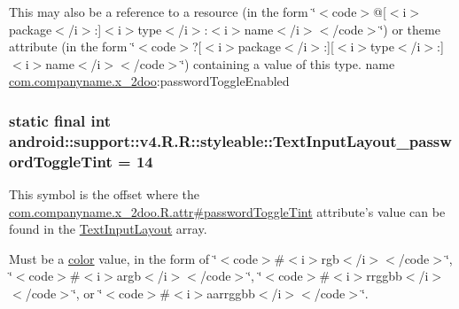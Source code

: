 This may also be a reference to a resource (in the form \char`\"{}$<$code$>$@\mbox{[}$<$i$>$package$<$/i$>$:\mbox{]}$<$i$>$type$<$/i$>$:$<$i$>$name$<$/i$>$$<$/code$>$\char`\"{}) or theme attribute (in the form \char`\"{}$<$code$>$?\mbox{[}$<$i$>$package$<$/i$>$:\mbox{]}\mbox{[}$<$i$>$type$<$/i$>$:\mbox{]}$<$i$>$name$<$/i$>$$<$/code$>$\char`\"{}) containing a value of this type.  name \hyperlink{namespacecom_1_1companyname_1_1x__2doo}{com.companyname.x\_\-2doo}:passwordToggleEnabled \hypertarget{classandroid_1_1support_1_1v4_1_1_r_1_1styleable_b9b1edb6651d08b5764eaf9bb8fb1d98}{
\subsubsection[{TextInputLayout\_\-passwordToggleTint}]{\setlength{\rightskip}{0pt plus 5cm}static final int android::support::v4.R.R::styleable::TextInputLayout\_\-passwordToggleTint = 14}}
\label{classandroid_1_1support_1_1v4_1_1_r_1_1styleable_b9b1edb6651d08b5764eaf9bb8fb1d98}


This symbol is the offset where the \hyperlink{classcom_1_1companyname_1_1x__2doo_1_1_r_1_1attr_04391bd41d9af65d94ff433abaec0b5c}{com.companyname.x\_\-2doo.R.attr\#passwordToggleTint} attribute's value can be found in the \hyperlink{classandroid_1_1support_1_1v4_1_1_r_1_1styleable_880beb171ce483ab1b63a82ef7f9d976}{TextInputLayout} array.

Must be a \hyperlink{classandroid_1_1support_1_1v4_1_1_r_1_1color}{color} value, in the form of \char`\"{}$<$code$>$\#$<$i$>$rgb$<$/i$>$$<$/code$>$\char`\"{}, \char`\"{}$<$code$>$\#$<$i$>$argb$<$/i$>$$<$/code$>$\char`\"{}, \char`\"{}$<$code$>$\#$<$i$>$rrggbb$<$/i$>$$<$/code$>$\char`\"{}, or \char`\"{}$<$code$>$\#$<$i$>$aarrggbb$<$/i$>$$<$/code$>$\char`\"{}. 

